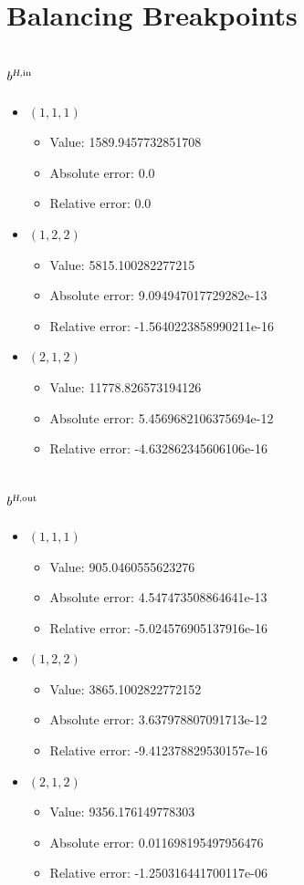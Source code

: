 \documentclass{article}%
\begin{document}
\section{Balancing Breakpoints}%
\subsection{$b^{\textsl{H},\text{in}}$}%
\begin{itemize}%
	\item $(1, 1, 1)$%
	\begin{itemize}%
		\item Value: 1589.9457732851708%
		\item Absolute error: 0.0%
		\item Relative error: 0.0%
	\end{itemize}%
	\item $(1, 2, 2)$%
	\begin{itemize}%
		\item Value: 5815.100282277215%
		\item Absolute error: 9.094947017729282e-13%
		\item Relative error: -1.5640223858990211e-16%
	\end{itemize}%
	\item $(2, 1, 2)$%
	\begin{itemize}%
		\item Value: 11778.826573194126%
		\item Absolute error: 5.4569682106375694e-12%
		\item Relative error: -4.632862345606106e-16%
	\end{itemize}%
\end{itemize}%
\subsection{$b^{\textsl{H},\text{out}}$}%
\begin{itemize}%
	\item $(1, 1, 1)$%
	\begin{itemize}%
		\item Value: 905.0460555623276%
		\item Absolute error: 4.547473508864641e-13%
		\item Relative error: -5.024576905137916e-16%
	\end{itemize}%
	\item $(1, 2, 2)$%
	\begin{itemize}%
		\item Value: 3865.1002822772152%
		\item Absolute error: 3.637978807091713e-12%
		\item Relative error: -9.412378829530157e-16%
	\end{itemize}%
	\item $(2, 1, 2)$%
	\begin{itemize}%
		\item Value: 9356.176149778303%
		\item Absolute error: 0.011698195497956476%
		\item Relative error: -1.250316441700117e-06%
	\end{itemize}%
\end{itemize}%
\end{document}
